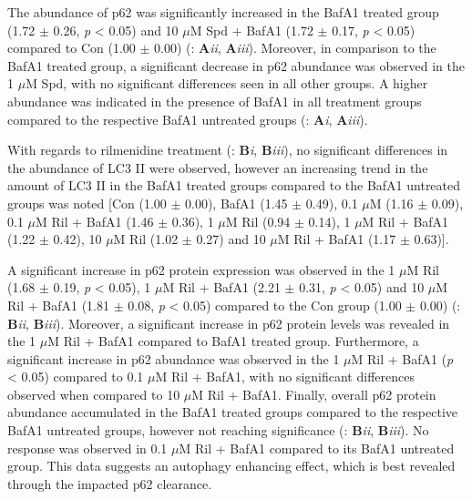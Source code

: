 {The abundance of p62 was significantly increased in the BafA1 treated group (1.72 $\pm$ 0.26, \textit{p} < 0.05) and  10 $\mu$M Spd + BafA1 (1.72 $\pm$ 0.17, \textit{p} < 0.05) compared to Con (1.00 $\pm$ 0.00) (: \textbf{A}\textit{ii}, \textbf{A}\textit{iii}). Moreover, in comparison to the BafA1 treated group, a significant decrease in p62 abundance was observed in the 1 $\mu$M Spd, with no significant differences seen in all other groups. A higher abundance was indicated in the presence of BafA1 in all treatment groups compared to the respective BafA1 untreated groups (: \textbf{A}\textit{i}, \textbf{A}\textit{iii}).

With regards to rilmenidine treatment (: \textbf{B}\textit{i}, \textbf{B}\textit{iii}), no significant differences in the abundance of LC3 II were observed, however an increasing trend in the amount of LC3 II in the BafA1 treated groups compared to the BafA1 untreated groups was noted [Con (1.00 $\pm$ 0.00), BafA1 (1.45 $\pm$ 0.49), 0.1 $\mu$M (1.16 $\pm$ 0.09), 0.1 $\mu$M Ril + BafA1 (1.46 $\pm$ 0.36), 1 $\mu$M Ril (0.94 $\pm$ 0.14), 1 $\mu$M Ril + BafA1 (1.22 $\pm$ 0.42), 10 $\mu$M Ril (1.02 $\pm$ 0.27) and 10 $\mu$M Ril + BafA1 (1.17 $\pm$ 0.63)].

A significant increase in p62 protein expression was observed in the 1 $\mu$M Ril (1.68 $\pm$ 0.19, \textit{p} < 0.05), 1 $\mu$M Ril + BafA1 (2.21 $\pm$ 0.31, \textit{p} < 0.05) and 10 $\mu$M Ril + BafA1 (1.81 $\pm$ 0.08, \textit{p} < 0.05) compared to the Con group (1.00 $\pm$ 0.00) (: \textbf{B}\textit{ii}, \textbf{B}\textit{iii}). Moreover, a significant increase in p62 protein levels was revealed in the 1 $\mu$M Ril + BafA1 compared to BafA1 treated group. Furthermore, a significant increase in p62 abundance was observed in the 1 $\mu$M Ril + BafA1 (\textit{p} < 0.05) compared to 0.1 $\mu$M Ril + BafA1, with no significant differences observed when compared to 10 $\mu$M Ril + BafA1. Finally, overall p62 protein abundance accumulated in the BafA1 treated groups compared to the respective BafA1 untreated groups, however not reaching significance (: \textbf{B}\textit{ii}, \textbf{B}\textit{iii}). No response was observed in 0.1 $\mu$M Ril + BafA1 compared to its BafA1 untreated group. This data suggests an autophagy enhancing effect, which is best revealed through the impacted p62 clearance.

}
